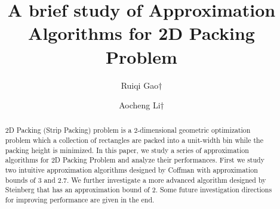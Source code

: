 \documentclass[sigplan,screen,nonacm]{acmart}\settopmatter{printfolios=true,printccs=false,printacmref=false}
\begin{document}
\sloppy

\title{A brief study of Approximation Algorithms for 2D Packing Problem}

\author{Ruiqi Gao$\dagger$}
\author{Aocheng Li$\dagger$}




\begin{abstract}
  2D Packing (Strip Packing) problem is a 2-dimensional geometric optimization problem which a collection of rectangles are packed into a unit-width bin while the packing height is minimized. In this paper, we study a series of approximation algorithms for 2D Packing Problem and analyze their performances. First we study two intuitive approximation algorithms designed by Coffman with approximation bounds of 3 and 2.7. We further investigate a more advanced algorithm designed by Steinberg that has an approximation bound of 2. Some future investigation directions for improving performance are given in the end.
\end{abstract}



\end{document}
